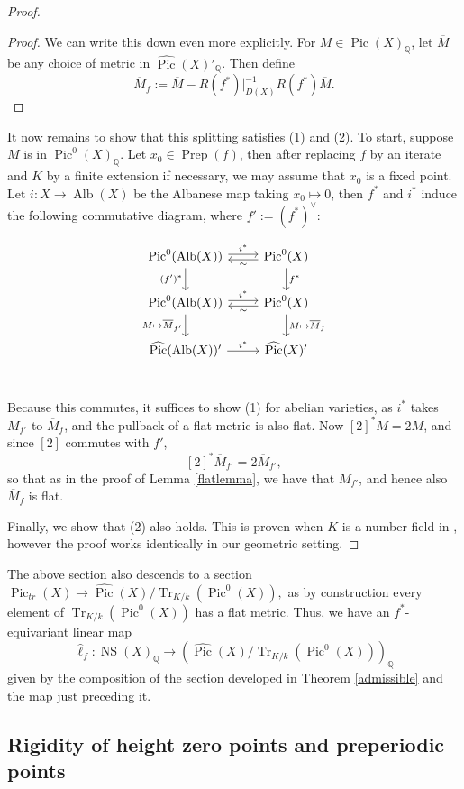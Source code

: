 \documentclass[times, doublespace]{amsart}
\numberwithin{equation}{section}
\theoremstyle{plain}
\theoremstyle{definition}
\DeclareMathOperator{\Pic}{Pic}
\DeclareMathOperator{\NS}{NS}
\DeclareMathOperator{\Prep}{Prep}
\DeclareMathOperator{\Alb}{Alb}
\newcommand{\Tr}{\operatorname{Tr}}
\newcommand{\imP}[1]{\Tr_{K/k}\left(\Pic^0(#1)\right)}
\newcommand{\trP}[1]{\operatorname{Pic}_{tr}(#1)}
\newcommand{\Q}{\mathbb{Q}}
\begin{document}
\begin{proof}
\begin{proof}
We can write this down even more explicitly. For $M\in\Pic(X)_{\Q}$, let $\overline M$ be any choice of metric in $\widehat{\Pic}(X)'_{\Q}$. Then define
\[ \overline M_f:=\overline M-R(f^*)|_{D(X)}^{-1}R(f^*)\overline M.\]
\end{proof}

It now remains to show that this splitting satisfies (1) and (2). To start, suppose $M$ is in $\Pic^0(X)_{\Q}$. Let $x_0\in\Prep(f)$, then after replacing $f$ by an iterate and $K$ by a finite extension if necessary, we may assume that $x_0$ is a fixed point. Let $i:X\to \Alb(X)$ be the Albanese map taking $x_0\mapsto0$, then $f^*$ and $i^*$ induce the following commutative diagram, where $f':=(f^*)^{\vee}$:

\[
\begin{tikzcd}
\Pic^0(\Alb(X)) \arrow[shift left=.5ex]{r}{i^*}\arrow{d}[left]{(f')^*} & \Pic^0(X)\arrow[shift left=.5ex]{l}{\sim}\arrow{d}{f^*}\\
\Pic^0(\Alb(X)) \arrow[shift left=.5ex]{r}{i^*}\arrow{d}[left]{M\mapsto\overline M_{f'}} & \Pic^0(X)\arrow[shift left=.5ex]{l}{\sim}\arrow{d}{M\mapsto\overline M_f}\\
\widehat{\Pic}(\Alb(X))' \arrow{r}{i^*} & \widehat{\Pic}(X)'\\
\end{tikzcd}
\]

Because this commutes, it suffices to show (1) for abelian varieties, as $i^*$ takes $M_{f'}$ to $\overline M_f$, and the pullback of a flat metric is also flat. Now $[2]^*M=2M$, and since $[2]$ commutes with $f'$, 
\[ [2]^*\overline M_{f'}=2\overline M_{f'},\]
so that as in the proof of Lemma \ref{flatlemma}, we have that $\overline M_{f'}$, and hence also $\overline M_f$ is flat.

Finally, we show that (2) also holds. This is proven when $K$ is a number field in \cite[Theorem 4.9]{yz}, however the proof works identically in our geometric setting. 
\end{proof}

The above section also descends to a section $\trP{X}\to\widehat{\Pic}(X)\big/\imP{X},$ as by construction every element of $\imP{X}$ has a flat metric. Thus, we have an $f^*$-equivariant linear map
\[ \widehat{\ell}_f:\NS(X)_{\Q}\longrightarrow\left(\widehat{\Pic}(X)/\imP{X}\right)_{\Q}\]
given  by the composition of the section developed in Theorem \ref{admissible} and the map just preceding it.

\subsection{Rigidity of height zero points and preperiodic points}
\end{document}
